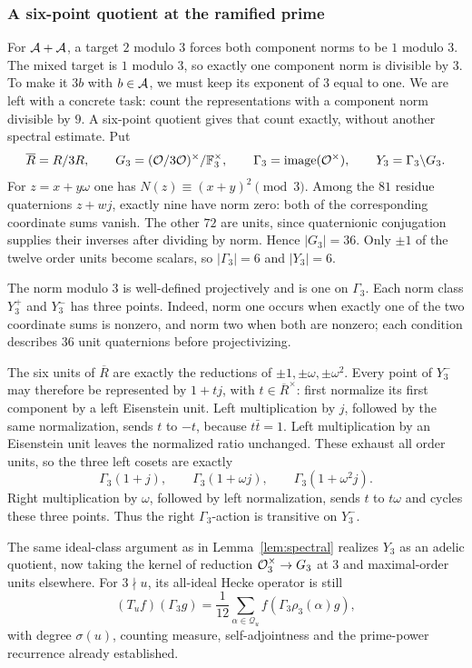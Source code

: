\subsubsection{A six-point quotient at the ramified prime}
For $\AA+\AA$, a target $2$ modulo $3$ forces both component norms
to be $1$ modulo $3$. The mixed target is $1$ modulo $3$, so exactly one
component norm is divisible by $3$. To make it $3b$ with $b\in\AA$,
we must keep its exponent of $3$ equal to one. We are left with a concrete
task: count the representations with a component norm divisible by $9$.
A six-point quotient gives that count exactly, without another spectral
estimate. Put
\[
\overline R=R/3R,\qquad
G_3=(\OO/3\OO)^\times/\F_3^\times,\qquad
\Gamma_3=\operatorname{image}(\OO^\times),\qquad
Y_3=\Gamma_3\backslash G_3.
\]
For $z=x+y\omega$ one has $N(z)\equiv(x+y)^2\pmod3$. Among the $81$
residue quaternions $z+w j$, exactly nine have norm zero: both of the
corresponding coordinate sums vanish. The other $72$ are units, since
quaternionic conjugation supplies their inverses after dividing by norm.
Hence $|G_3|=36$. Only $\pm1$ of the twelve order units become scalars,
so $|\Gamma_3|=6$ and $|Y_3|=6$.

The norm modulo $3$ is well-defined projectively and is one on
$\Gamma_3$. Each norm class $Y_3^+$ and $Y_3^-$ has three points.
Indeed, norm one occurs when exactly one of the two coordinate sums is
nonzero, and norm two when both are nonzero; each condition describes
$36$ unit quaternions before projectivizing.

The six units of $\overline R$ are exactly the reductions of
$\pm1,\pm\omega,\pm\omega^2$. Every point of $Y_3^-$ may therefore be
represented by $1+t j$, with $t\in\overline R^\times$: first normalize
its first component by a left Eisenstein unit. Left multiplication by
$j$, followed by the same normalization, sends $t$ to $-t$, because
$t\bar t=1$. Left multiplication by an Eisenstein unit leaves the
normalized ratio unchanged. These exhaust all order units, so the three
left cosets are exactly
\[
\Gamma_3(1+j),\qquad
\Gamma_3(1+\omega j),\qquad
\Gamma_3(1+\omega^2j).
\]
Right multiplication by $\omega$, followed by left normalization, sends
$t$ to $t\omega$ and cycles these three points. Thus the right
$\Gamma_3$-action is transitive on $Y_3^-$.

The same ideal-class argument as in Lemma~\ref{lem:spectral} realizes
$Y_3$ as an adelic quotient, now taking the kernel of reduction
$\OO_3^\times\to G_3$ at $3$ and maximal-order units elsewhere.
For $3\nmid u$, its all-ideal Hecke operator is still
\[
(T_uf)(\Gamma_3 g)=\frac1{12}\sum_{\alpha\in\mathcal Q_u}
 f(\Gamma_3\rho_3(\alpha)g),
\]
with degree $\sigma(u)$, counting measure, self-adjointness and the
prime-power recurrence already established.

